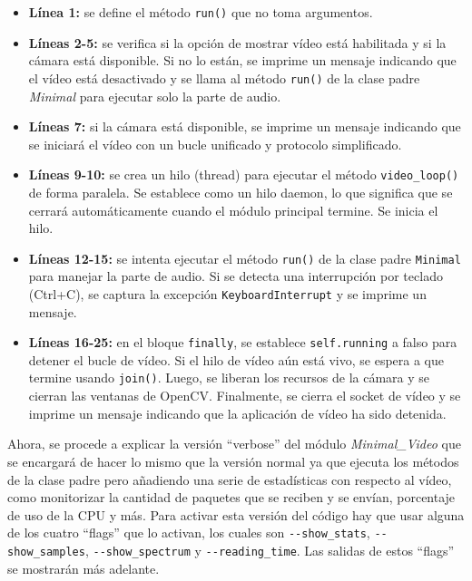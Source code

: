 \begin{itemize}
    \item \textbf{Línea 1:} se define el método \texttt{run()} que no toma argumentos.
    \item \textbf{Líneas 2-5:} se verifica si la opción de mostrar vídeo está habilitada y si la cámara está disponible. Si no lo están, se imprime un mensaje indicando que el vídeo está desactivado y se llama al método \texttt{run()} de la clase padre \textit{Minimal} para ejecutar solo la parte de audio.
    \item \textbf{Líneas 7:} si la cámara está disponible, se imprime un mensaje indicando que se iniciará el vídeo con un bucle unificado y protocolo simplificado.
    \item \textbf{Líneas 9-10:} se crea un hilo (thread) para ejecutar el método \texttt{video\_loop()} de forma paralela. Se establece como un hilo daemon, lo que significa que se cerrará automáticamente cuando el módulo principal termine. Se inicia el hilo.
    \item \textbf{Líneas 12-15:} se intenta ejecutar el método \texttt{run()} de la clase padre \texttt{Minimal} para manejar la parte de audio. Si se detecta una interrupción por teclado (Ctrl+C), se captura la excepción \texttt{KeyboardInterrupt} y se imprime un mensaje.
    \item \textbf{Líneas 16-25:} en el bloque \texttt{finally}, se establece \texttt{self.running} a falso para detener el bucle de vídeo. Si el hilo de vídeo aún está vivo, se espera a que termine usando \texttt{join()}. Luego, se liberan los recursos de la cámara y se cierran las ventanas de OpenCV. Finalmente, se cierra el socket de vídeo y se imprime un mensaje indicando que la aplicación de vídeo ha sido detenida.
\end{itemize}

\vspace{\baselineskip}

Ahora, se procede a explicar la versión ``verbose'' del módulo \textit{Minimal\_Video} que se encargará de hacer lo mismo que la versión normal ya que ejecuta los métodos de la clase padre pero añadiendo una serie de estadísticas con respecto al vídeo, como monitorizar la cantidad de paquetes que se reciben y se envían, porcentaje de uso de la CPU y más. Para activar esta versión del código hay que usar alguna de los cuatro ``flags'' que lo activan, los cuales son \verb|--show_stats|, \verb|--show_samples|, \verb|--show_spectrum| y \verb|--reading_time|. Las salidas de estos ``flags'' se mostrarán más adelante. 
\vspace{\baselineskip}

